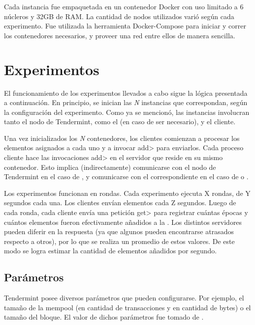 %
Cada instancia fue empaquetada en un contenedor Docker con uso limitado a 6 núcleros y 32GB de RAM.
%
La cantidad de nodos utilizados varió según cada experimento.
%
Fue utilizada la herramienta Docker-Compose para iniciar y correr los contenedores necesarios,
y proveer una red entre ellos de manera sencilla.


\section{Experimentos}
El funcionamiento de los experimentos llevados a cabo sigue la lógica presentada a continuación.
%
En principio, se inician las \textit{N} instancias que correspondan, según la configuración del experimento.
%
Como ya se mencionó, las instancias involucran tanto el nodo de Tendermint, como el \collector (en caso de
ser necesario), y el cliente.
%

Una vez inicializados los \textit{N} contenedores, los clientes comienzan a procesar los elementos asignados a cada
uno y a invocar \<add> para enviarlos.
%
Cada proceso cliente hace las invocaciones \<add> en el servidor que reside en su mismo contenedor. 
%
Esto implica (indirectamente) comunicarse con el nodo de Tendermint en el caso de \vanilla, y
comunicarse con el \collector correspondiente en el caso de \compresschain o \hashchain.

Los experimentos funcionan en rondas.
%
Cada experimento ejecuta X rondas, de Y segundos cada una.
%
Los clientes envían elementos cada Z segundos.
%
Luego de cada ronda, cada cliente envía una petición \<get> para registrar cuántas épocas y cuántos
elementos fueron efectivamente añadidos a la \setchain.
%
Los distintos servidores pueden diferir en la respuesta (ya que algunos pueden encontrarse atrasados
respecto a otros), por lo que se realiza un promedio de estos valores.
%
De este modo se logra estimar la cantidad de elementos añadidos por segundo.

\subsection{Parámetros}
Tendermint posee diversos parámetros que pueden configurarse.
Por ejemplo, el tamaño de la mempool
(en cantidad de transacciones y en cantidad de bytes) o el tamaño del bloque.
El valor de dichos parámetros fue tomado de \cite{tendermint.design}.

\bigskip

